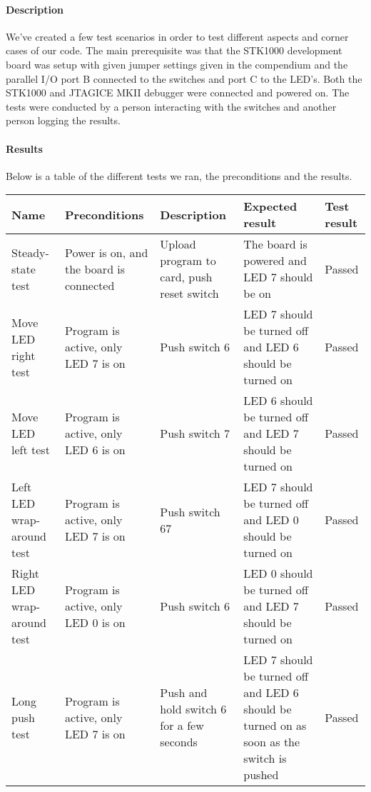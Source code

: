 \documentclass[a4paper,11pt]{article}
\begin{document}
\paragraph{Description}
We've created a few test scenarios in order to test different aspects and corner cases of our code. The main prerequisite was that the STK1000 development board was setup with given jumper settings given in the compendium and the parallel I/O port B connected to the switches and port C to the LED’s. Both the STK1000 and JTAGICE MKII debugger were connected and powered on. The tests were conducted by a person interacting with the switches and another person logging the results.

\paragraph{Results}
Below is a table of the different tests we ran, the preconditions and the results.
\linebreak

\renewcommand{\arraystretch}{1.25} %
\begin{tabular}[pos]{|m{70pt}|m{90pt}|m{90pt}|m{100pt}|m{60pt}|}
\hline
\textbf{Name} 				& \textbf{Preconditions}				& \textbf{Description} 					& \textbf{Expected result} 													& \textbf{Test result} 		\\ \hline

Steady-state test			& Power is on, and the board is connected & Upload program to card, push reset switch 	& The board is powered and LED 7 should be on 									& Passed 				\\ \hline

Move LED right test			& Program is active, only LED 7 is on 		& Push switch 6						 	& LED 7 should be turned off and LED 6 should be turned on 							& Passed 				\\ \hline

Move LED left test			& Program is active, only LED 6 is on 		& Push switch 7						 	& LED 6 should be turned off and LED 7 should be turned on 							& Passed 				\\ \hline

Left LED wrap-around test		& Program is active, only LED 7 is on 		& Push switch 67					 	& LED 7 should be turned off and LED 0 should be turned on 							& Passed 				\\ \hline

Right LED wrap-around test	& Program is active, only LED 0 is on 		& Push switch 6						 	& LED 0 should be turned off and LED 7 should be turned on 							& Passed 				\\ \hline

Long push test				& Program is active, only LED 7 is on 		& Push and hold switch 6 for a few seconds 	& LED 7 should be turned off and LED 6 should be turned on as soon as the switch is pushed 	& Passed 				\\ \hline
\end{tabular}
\end{document}

